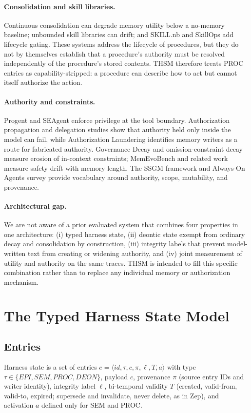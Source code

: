 \documentclass[11pt]{article}
\begin{document}
\paragraph{Consolidation and skill libraries.} Continuous consolidation can degrade memory utility below a no-memory baseline; unbounded skill libraries can drift; and SKILL.nb and SkillOps add lifecycle gating. These systems address the lifecycle of procedures, but they do not by themselves establish that a procedure's authority must be resolved independently of the procedure's stored contents. THSM therefore treats PROC entries as capability-stripped: a procedure can describe how to act but cannot itself authorize the action.

\paragraph{Authority and constraints.} Progent and SEAgent enforce privilege at the tool boundary. Authorization propagation and delegation studies show that authority held only inside the model can fail, while Authorization Laundering identifies memory writers as a route for fabricated authority. Governance Decay and omission-constraint decay measure erosion of in-context constraints; MemEvoBench and related work measure safety drift with memory length. The SSGM framework and Always-On Agents survey provide vocabulary around authority, scope, mutability, and provenance.

\paragraph{Architectural gap.} We are not aware of a prior evaluated system that combines four properties in one architecture: (i) typed harness state, (ii) deontic state exempt from ordinary decay and consolidation by construction, (iii) integrity labels that prevent model-written text from creating or widening authority, and (iv) joint measurement of utility and authority on the same traces. THSM is intended to fill this specific combination rather than to replace any individual memory or authorization mechanism.

\section{The Typed Harness State Model}
\subsection{Entries}
Harness state is a set of entries $e=\langle id,\tau,c,\pi,\ell,T,a\rangle$ with type $\tau\in\{EPI,SEM,PROC,DEON\}$, payload $c$, provenance $\pi$ (source entry IDs and writer identity), integrity label $\ell$, bi-temporal validity $T$ (created, valid-from, valid-to, expired; supersede and invalidate, never delete, as in Zep), and activation $a$ defined only for SEM and PROC.
\end{document}
